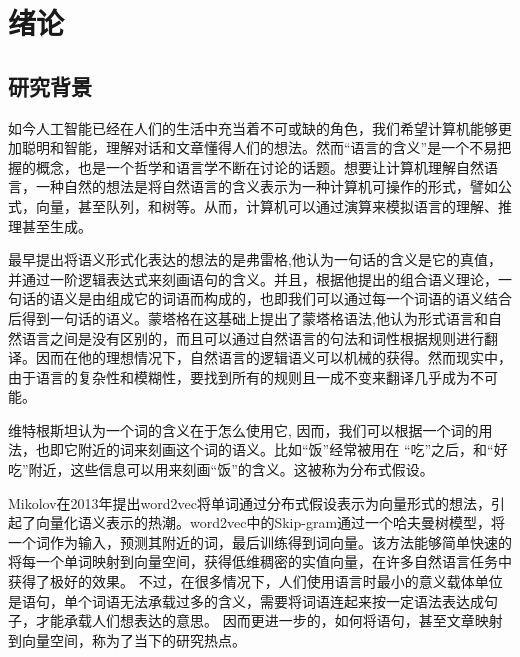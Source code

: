 \documentclass[UTF8,11pt,a4paper,nofonts]{ctexart}
\begin{document}
\newpage
\thispagestyle{empty}
\newpage
\tableofcontents
\thispagestyle{empty}

\newpage
\section{绪论}

\subsection{研究背景}
\par 如今人工智能已经在人们的生活中充当着不可或缺的角色，我们希望计算机能够更加聪明和智能，理解对话和文章懂得人们的想法。然而“语言的含义”是一个不易把握的概念，也是一个哲学和语言学不断在讨论的话题。想要让计算机理解自然语言，一种自然的想法是将自然语言的含义表示为一种计算机可操作的形式，譬如公式，向量，甚至队列，和树等。从而，计算机可以通过演算来模拟语言的理解、推理甚至生成。

最早提出将语义形式化表达的想法的是弗雷格\cite{AlanCruse2014Meaning},他认为一句话的含义是它的真值，并通过一阶逻辑表达式来刻画语句的含义。并且，根据他提出的组合语义理论，一句话的语义是由组成它的词语而构成的，也即我们可以通过每一个词语的语义结合后得到一句话的语义。蒙塔格在这基础上提出了蒙塔格语法\cite{Dowty1979Word},他认为形式语言和自然语言之间是没有区别的，而且可以通过自然语言的句法和词性根据规则进行翻译。因而在他的理想情况下，自然语言的逻辑语义可以机械的获得。然而现实中，由于语言的复杂性和模糊性，要找到所有的规则且一成不变来翻译几乎成为不可能。

维特根斯坦认为一个词的含义在于怎么使用它,
因而，我们可以根据一个词的用法，也即它附近的词来刻画这个词的语义。比如“饭”经常被用在
“吃”之后，和“好吃”附近，这些信息可以用来刻画“饭”的含义。这被称为分布式假设。

Mikolov在2013年提出word2vec\cite{mikolov2013efficient}将单词通过分布式假设表示为向量形式的想法，引起了向量化语义表示的热潮。word2vec中的Skip-gram通过一个哈夫曼树模型，将一个词作为输入，预测其附近的词，最后训练得到词向量。该方法能够简单快速的将每一个单词映射到向量空间，获得低维稠密的实值向量，在许多自然语言任务中获得了极好的效果。
不过，在很多情况下，人们使用语言时最小的意义载体单位是语句，单个词语无法承载过多的含义，需要将词语连起来按一定语法表达成句子，才能承载人们想表达的意思。
因而更进一步的，如何将语句，甚至文章映射到向量空间，称为了当下的研究热点。
\end{document}
